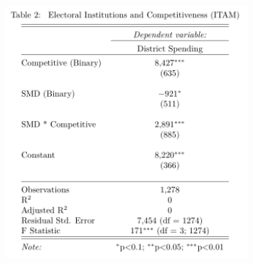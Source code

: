 \documentclass{article}
\begin{document}

\iffalse
\includegraphics[width=90mm]{Regressions_ITAM}\\
\end{document}
